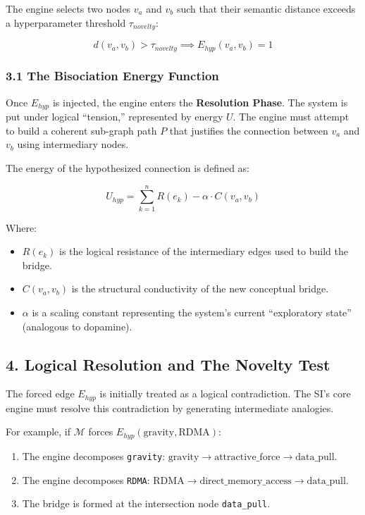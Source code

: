 \documentclass[
  11pt,
  a4paper,
]{article}
\providecommand{\tightlist}{%
  \setlength{\itemsep}{0pt}\setlength{\parskip}{0pt}}
\begin{document}
The engine selects two nodes \(v_a\) and \(v_b\) such that their
semantic distance exceeds a hyperparameter threshold \(\tau_{novelty}\):

\[ d(v_a, v_b) > \tau_{novelty} \implies E_{hyp}(v_a, v_b) = 1 \]

\subsubsection{3.1 The Bisociation Energy
Function}\label{the-bisociation-energy-function}

Once \(E_{hyp}\) is injected, the engine enters the \textbf{Resolution
Phase}. The system is put under logical ``tension,'' represented by
energy \(U\). The engine must attempt to build a coherent sub-graph path
\(P\) that justifies the connection between \(v_a\) and \(v_b\) using
intermediary nodes.

The energy of the hypothesized connection is defined as:

\[ U_{hyp} = \sum_{k=1}^{n} R(e_k) - \alpha \cdot C(v_a, v_b) \]

Where:

\begin{itemize}
\tightlist
\item
  \(R(e_k)\) is the logical resistance of the intermediary edges used to
  build the bridge.
\item
  \(C(v_a, v_b)\) is the structural conductivity of the new conceptual
  bridge.
\item
  \(\alpha\) is a scaling constant representing the system's current
  ``exploratory state'' (analogous to dopamine).
\end{itemize}

\subsection{4. Logical Resolution and The Novelty
Test}\label{logical-resolution-and-the-novelty-test}

The forced edge \(E_{hyp}\) is initially treated as a logical
contradiction. The SI's core engine must resolve this contradiction by
generating intermediate analogies.

For example, if \(\mathcal{M}\) forces
\(E_{hyp}(\text{gravity}, \text{RDMA})\):

\begin{enumerate}
\def\labelenumi{\arabic{enumi}.}
\tightlist
\item
  The engine decomposes \texttt{gravity}:
  \(\text{gravity} \to \text{attractive\_force} \to \text{data\_pull}\).
\item
  The engine decomposes \texttt{RDMA}:
  \(\text{RDMA} \to \text{direct\_memory\_access} \to \text{data\_pull}\).
\item
  The bridge is formed at the intersection node \texttt{data\_pull}.
\end{enumerate}
\end{document}
